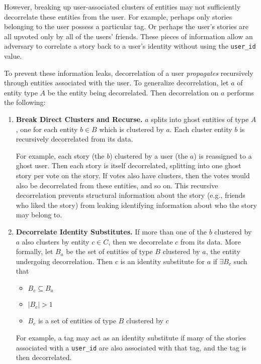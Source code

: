 However, breaking up user-associated clusters of entities may not sufficiently decorrelate these
entities from the user. For example, perhaps only stories belonging to the user possess a particular
tag. Or perhaps the user's stories are all upvoted only by all of the users'
friends. These pieces of information allow an adversary to correlate a story back to a user's
identity without using the \texttt{user\_id} value. 

To prevent these information leaks, decorrelation of a user \emph{propagates} recursively through
entities associated with the user. To generalize decorrelation, let $a$ of entity type $A$ be the
entity being decorrelated. Then decorrelation on $a$ performs the following: 
\begin{enumerate}
    \item \textbf{Break Direct Clusters and Recurse.} $a$ splits into ghost entities of type $A$, one for each entity
        $b\in B$ which is clustered by $a$. Each cluster entity $b$ is recursively
        decorrelated from its data.

        For example, each story (the $b$) clustered by a user (the $a$) is reassigned to a ghost
        user. Then each story is itself decorrelated, splitting into one ghost story per vote on the
        story. If votes also have clusters, then the votes would also be decorrelated from these
        entities, and so on. This recursive decorrelation prevents structural information about the
        story (e.g., friends who liked the story) from leaking identifying information about who the
        story may belong to.

    \item \textbf{Decorrelate Identity Substitutes.} If more than one of the $b$ clustered by $a$ also
        clusters by entity $c \in C$, then we decorrelate $c$ from its data. 
        More formally, let $B_a$ be the set of entities of type $B$ clustered by $a$, the entity undergoing
        decorrelation.  Then $c$ is an identity substitute for $a$ if $\exists B_c$ such that
        \begin{itemize}
            \item $B_c \subseteq B_a$
            \item $|B_c| > 1$ 
            \item $B_c$ is a set of entities of type $B$ clustered by $c$
        \end{itemize}

        For example, a tag may act as an identity substitute if many of the stories associated with
        a \texttt{user\_id} are also associated with that tag, and the tag is then decorrelated.
\end{enumerate}

